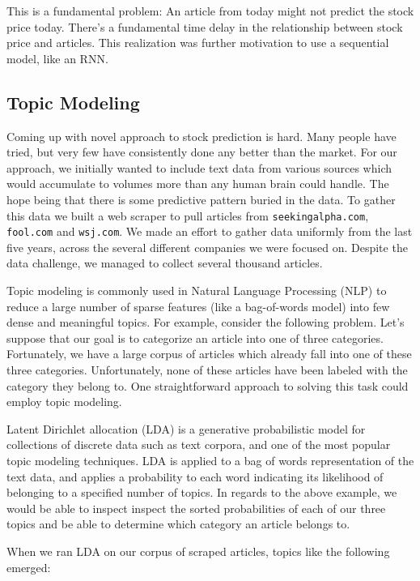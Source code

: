 \documentclass{article}
\begin{document}
This is a fundamental problem: An article from today might not predict the stock price today. There's a fundamental time delay in the relationship between stock price and articles. This realization was further motivation to use a sequential model, like an RNN. 

\subsection{Topic Modeling}

Coming up with novel approach to stock prediction is hard. Many people have tried, but very few have consistently done any better than the market. For our approach, we initially wanted to include text data from various sources which would accumulate to volumes more than any human brain could handle. The hope being that there is some predictive pattern buried in the data. To gather this data we built a web scraper to pull articles from \texttt{seekingalpha.com}, \texttt{fool.com} and \texttt{wsj.com}. We made an effort to gather data uniformly from the last five years, across the several different companies we were focused on. Despite the data challenge, we managed to collect several thousand articles.

Topic modeling is commonly used in Natural Language Processing (NLP) to reduce a large number of sparse features (like a bag-of-words model) into few dense and meaningful topics. For example, consider the following problem. Let’s suppose that our goal is to categorize an article into one of three categories. Fortunately, we have a large corpus of articles which already fall into one of these three categories. Unfortunately, none of these articles have been labeled with the category they belong to. One straightforward approach to solving this task could employ topic modeling.

Latent Dirichlet allocation (LDA) is a generative probabilistic model for collections of discrete data such as text corpora, and one of the most popular topic modeling techniques. LDA is applied to a bag of words representation of the text data, and applies a probability to each word indicating its likelihood of belonging to a specified number of topics. In regards to the above example, we would be able to inspect inspect the sorted probabilities of each of our three topics and be able to determine which category an article belongs to.

When we ran LDA on our corpus of scraped articles, topics like the following emerged:
\end{document}
